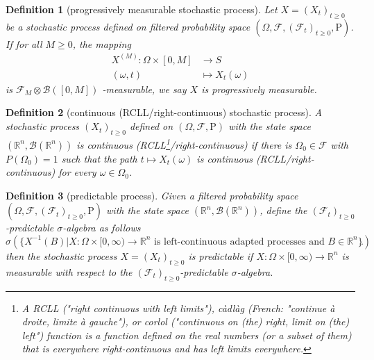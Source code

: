 \documentclass{report}
\newtheorem{definition}{Definition}[section]
\theoremstyle{nonumberplain}
\begin{document}
\begin{definition}[progressively measurable stochastic process]
	Let $X=(X_t)_{t\ge0}$ be a stochastic process defined on filtered probability space $(\Omega,\mathcal{F},(\mathcal{F}_{t})_{t\ge0},\mathrm{P})$. If for all $M\ge0$, the mapping
	\begin{align*}
	X^{(M)}: \Omega \times [0, M]&\longrightarrow S\\
	(\omega,t)&\longmapsto X_t(\omega)
	\end{align*}
	is $\mathcal{F}_M\otimes \mathcal{B}([0,M])$ -measurable, we say $X$ is \emph{progressively measurable}.
\end{definition}



\begin{definition}[continuous (RCLL/right-continuous) stochastic process]
	A stochastic process $(X_t)_{t\ge0}$ defined on $(\Omega,\mathcal{F},\mathrm{P})$ with the state space $(\mathbb{R}^n,\mathcal{B}(\mathbb{R}^n))$ is continuous (RCLL\footnote{A RCLL ("right continuous with left limits"), càdlàg (French: "continue à droite, limite à gauche"), or corlol ("continuous on (the) right, limit on (the) left") function is a function defined on the real numbers (or a subset of them) that is everywhere right-continuous and has left limits everywhere.}/right-continuous) if there	is $\Omega_0\in\mathcal{F}$  with $P(\Omega_0) = 1$ such that the path $t\mapsto X_t(\omega)$ is continuous (RCLL/right-continuous) for every $\omega\in\Omega_0$.
\end{definition}




\begin{definition}[predictable process]
	Given a filtered probability space $\left(\Omega, \mathcal{F},(\mathcal{F}_{t})_{t \ge 0}, \mathrm{P}\right)$ with the state space $(\mathbb{R}^n,\mathcal{B}(\mathbb{R}^n))$, define the \emph{$(\mathcal{F}_{t})_{t \ge 0}$-predictable $\sigma$-algebra} as follows
	\[
	\sigma\left(\{X^{-1}(B)|X:\Omega\times[0,\infty)\longrightarrow \mathbb{R}^n\text{ is left-continuous adapted processes and } B\in\mathbb{R}^n\}\right).
	\]
	then the stochastic process $X=\left(X_{t}\right)_{t \ge 0}$ is \emph{predictable} if $X:\Omega\times[0,\infty)\longrightarrow \mathbb{R}^n$ is measurable with respect to the $(\mathcal{F}_{t})_{t \ge 0}$-predictable $\sigma$-algebra.
\end{definition}
\end{document}
